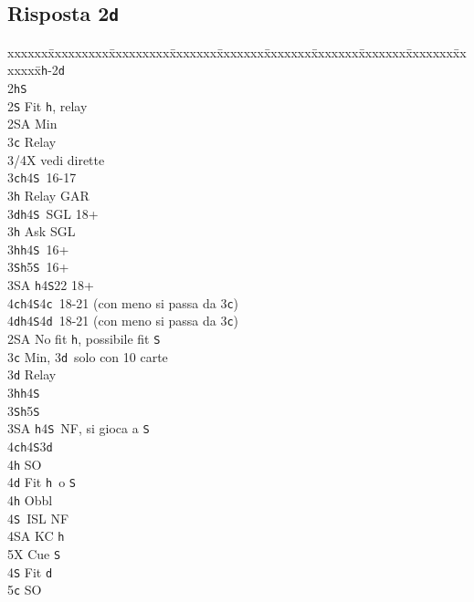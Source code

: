 \documentclass[a4paper,italian]{article}
\newcommand{\BS}{\small{\texttt{S}}}
\newcommand{\BC}{\small{\texttt{c}}}
\newcommand{\BD}{\small{\texttt{d}}}
\newcommand{\BH}{\small{\texttt{h}}}
\newcommand{\pdfd}{\texorpdfstring{\texttt{d}}{D}}
\newenvironment{bidtable}
{\begin{tabbing}

    xxxxxx\=xxxxxxxxx\=xxxxxxxxx\=xxxxxxx\=xxxxxxx\=xxxxxxx\=xxxxxxx\=xxxxxxx\=xxxxxxx\=xxxxxxx\=\kill}
{\end{tabbing} }%
\begin{document}
\subsection{Risposta 2\pdfd}

\begin{multicols}{2}
    \begin{bidtable}
        1\BH-2\BD\\
        2\BH {}\BS \+\\
        2\BS \> Fit \BH , relay\+\\
        2\small{SA} \> Min\+\\
        3\BC \> Relay\+\\
        3/4X \> vedi dirette\-\-\\
        3\BC {}\BH 4\BS\ 16-17\+\\
        3\BH \> Relay GAR\-\\
        3\BD {}\BH 4\BS\ SGL 18+\+\\
        3\BH \> Ask SGL\-\\
        3\BH {}\BH 4\BS\ 16+\\
        3\BS {}\BH 5\BS\ 16+\\
        3\small{SA} \BH 4\BS 22 18+\\
        4\BC {}\BH 4\BS 4\BC\ 18-21 (con meno si passa da 3\BC )\\
        4\BD {}\BH 4\BS 4\BD\ 18-21 (con meno si passa da 3\BC )\-\\
        2\small{SA} \> No fit \BH , possibile fit \BS \+\\
        3\BC \> Min, 3\BD\ solo con 10 carte\+\\
        3\BD \> Relay\+\\
        3\BH {}\BH 4\BS \\
        3\BS {}\BH 5\BS \\
        3\small{SA} \BH 4\BS\ NF, si gioca a \BS \\
        4\BC {}\BH 4\BS 3\BD \+\\
        4\BH \> SO\\
        4\BD \> Fit \BH\ o \BS \+\\
        4\BH \> Obbl\+\\
        4\BS\ ISL NF\\
        4\small{SA} KC \BH \\
        5X Cue \BS \-\-\\
        4\BS \> Fit \BD \\
        5\BC \> SO\-\-\\

\end{bidtable}
\end{multicols}
\end{document}
